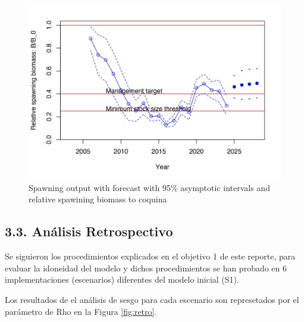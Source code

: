 \documentclass[
]{article}
\begin{document}
\begin{figure}[H]

{\centering \includegraphics[width=0.8\linewidth]{Dtrunculus_SS3_2024_files/figure-latex/ssb1-1} 

}

\caption{\label{ssb1}Spawning output with forecast with 95\% asymptotic intervals and relative spawining biomass to coquina}\label{fig:ssb1}
\end{figure}

\hypertarget{anuxe1lisis-retrospectivo}{%
\subsection{3.3. Análisis Retrospectivo}\label{anuxe1lisis-retrospectivo}}

Se siguieron los procedimientos explicados en el objetivo 1 de este reporte, para evaluar la idoneidad
del modelo y dichos procedimientos se han probado en 6 implementaciones (escenarios) diferentes del
modelo inicial (S1).

Los resultados de el análisis de sesgo para cada escenario son represetados por el parámetro de Rho en la Figura \ref{fig:retro}.
\end{document}
